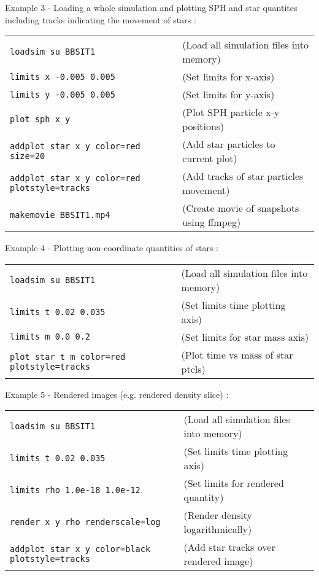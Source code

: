 \documentclass[a4paper]{article}
\newcommand{\var}[1]{\texttt{#1}}
\begin{document}
\noindent Example 3 - Loading a whole simulation and plotting SPH and star quantites including tracks indicating the movement of stars : \\

\begin{tabular}{p{7cm}p{6cm}}
\var{loadsim su BBSIT1} &               (Load all simulation files into memory) \\
\var{limits x -0.005 0.005} &           (Set limits for x-axis) \\
\var{limits y -0.005 0.005} &           (Set limits for y-axis) \\
\var{plot sph x y} &                    (Plot SPH particle x-y positions) \\
\var{addplot star x y color=red size=20} &  (Add star particles to current plot) \\
\var{addplot star x y color=red plotstyle=tracks} &            (Add tracks of star particles movement) \\
    
\var{makemovie BBSIT1.mp4} &             (Create movie of snapshots using ffmpeg)
\end{tabular}
\newline


\noindent Example 4 - Plotting non-coordinate quantities of stars : \\

\begin{tabular}{p{7cm}p{6cm}}
\var{loadsim su BBSIT1} &               (Load all simulation files into memory) \\
\var{limits t 0.02 0.035} &                    (Set limits time plotting axis) \\
\var{limits m 0.0 0.2} &                      (Set limits for star mass axis) \\
\var{plot star t m color=red plotstyle=tracks} & (Plot time vs mass of star ptcls)     
\end{tabular}
\newline


\noindent Example 5 - Rendered images (e.g. rendered density slice) : \\

\begin{tabular}{p{7cm}p{6cm}}
\var{loadsim su BBSIT1} &       (Load all simulation files into memory) \\
\var{limits t 0.02 0.035} &            (Set limits time plotting axis) \\
\var{limits rho 1.0e-18 1.0e-12} &     (Set limits for rendered quantity) \\
\var{render x y rho renderscale=log} & (Render density logarithmically) \\
\var{addplot star x y color=black plotstyle=tracks} & (Add star tracks over rendered image)
\end{tabular}
\newline
\end{document}
